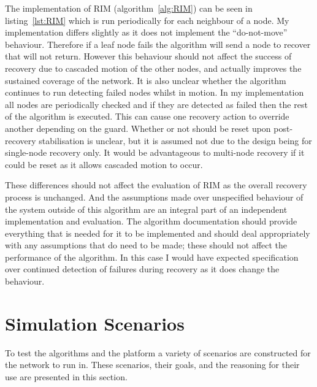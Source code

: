 \documentclass[authoryearcitations]{UoYCSproject}
\begin{document}
The implementation of RIM (algorithm~\ref{alg:RIM}) can be seen in listing~\ref{lst:RIM} which is run periodically for each neighbour of a node. My implementation differs slightly as it does not implement the ``do-not-move'' behaviour. Therefore if a leaf node fails the algorithm will send a node to recover that will not return. However this behaviour should not affect the success of recovery due to cascaded motion of the other nodes, and actually improves the sustained coverage of the network. It is also unclear whether the algorithm continues to run detecting failed nodes whilst in motion. In my implementation all nodes are periodically checked and if they are detected as failed then the rest of the algorithm is executed. This can cause one recovery action to override another depending on the  guard. Whether or not  should be reset upon post-recovery stabilisation is unclear, but it is assumed not due to the design being for single-node recovery only. It would be advantageous to multi-node recovery if it could be reset as it allows cascaded motion to occur.

These differences should not affect the evaluation of RIM as the overall recovery process is unchanged. And the assumptions made over unspecified behaviour of the system outside of this algorithm are an integral part of an independent implementation and evaluation. The algorithm documentation should provide everything that is needed for it to be implemented and should deal appropriately with any assumptions that do need to be made; these should not affect the performance of the algorithm. In this case I would have expected specification over continued detection of failures during recovery as it does change the behaviour.


\section{Simulation Scenarios}
\label{sec:scenarios}

To test the algorithms and the platform a variety of scenarios are constructed for the network to run in. These scenarios, their goals, and the reasoning for their use are presented in this section.
\end{document}
